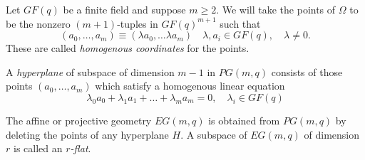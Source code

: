 \documentclass[12pt,twoside]{reedthesis}
\theoremstyle{definition}
\begin{document}
Let $GF(q)$ be a finite field and suppose $m \geq 2$. We will take the points of $\Omega$ to be the nonzero $(m+1)$-tuples in $GF(q)^{m+1}$ such that
\begin{equation*}
(a_0, \ldots, a_m) \equiv (\lambda a_0, \ldots \lambda a_m) \quad \lambda, a_i \in GF(q), \quad \lambda \neq 0.
\end{equation*}
These are called \textit{homogenous coordinates} for the points. 

A \textit{hyperplane} of subspace of dimension $m-1$ in $PG(m,q)$ consists of those points $(a_0, \ldots , a_m)$ which satisfy a homogenous linear equation 
\begin{equation*}
\lambda_0 a_0 + \lambda_1 a_1 + \ldots + \lambda_m a_m = 0, \quad \lambda_i \in GF(q)
\end{equation*}

The affine or projective geometry $EG(m,q)$ is obtained from $PG(m,q)$ by deleting the points of any hyperplane $H$. A subspace of $EG(m,q)$ of dimension $r$ is called an \textit{$r$-flat}. 

  \backmatter %

    \nocite{*}


%  
 

\end{document}
